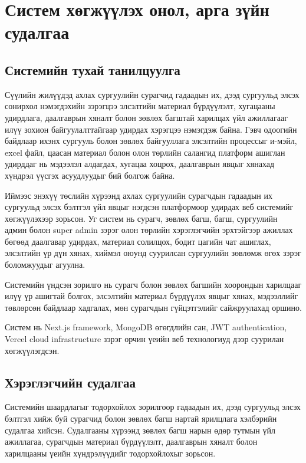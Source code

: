 \chapter{Систем хөгжүүлэх онол, арга зүйн судалгаа}

\section{Системийн тухай танилцуулга}

Сүүлийн жилүүдэд ахлах сургуулийн сурагчид гадаадын их, дээд сургуульд элсэх
сонирхол нэмэгдэхийн зэрэгцээ элсэлтийн материал бүрдүүлэлт, хугацааны удирдлага,
даалгаврын хяналт болон зөвлөх багштай харилцах үйл ажиллагааг илүү зохион
байгуулалттайгаар удирдах хэрэгцээ нэмэгдэж байна. Гэвч одоогийн байдлаар ихэнх
сургууль болон зөвлөх байгууллага элсэлтийн процессыг и-мэйл, excel файл,
цаасан материал болон олон төрлийн салангид платформ ашиглан удирддаг нь
мэдээлэл алдагдах, хугацаа хоцрох, даалгаврын явцыг хянахад хүндрэл үүсгэх
асуудлуудыг бий болгож байна.

Иймээс энэхүү төслийн хүрээнд ахлах сургуулийн сурагчдын гадаадын их
сургуульд элсэх бэлтгэл үйл явцыг нэгдсэн платформоор удирдах веб системийг
хөгжүүлэхээр зорьсон. Уг систем нь сурагч, зөвлөх багш, багш, сургуулийн админ
болон super admin зэрэг олон төрлийн хэрэглэгчийн эрхтэйгээр ажиллах бөгөөд
даалгавар удирдах, материал солилцох, бодит цагийн чат ашиглах, элсэлтийн
үр дүн хянах, хиймэл оюунд суурилсан сургуулийн зөвлөмж өгөх зэрэг боломжуудыг агуулна.

Системийн үндсэн зорилго нь сурагч болон зөвлөх багшийн хоорондын
харилцааг илүү үр ашигтай болгох, элсэлтийн материал бүрдүүлэх явцыг хянах, мэдээллийг төвлөрсөн байдлаар хадгалах, мөн сурагчдын гүйцэтгэлийг
сайжруулахад оршино.

Систем нь Next.js framework, MongoDB өгөгдлийн сан, JWT authentication,
Vercel cloud infrastructure зэрэг орчин үеийн веб технологиуд дээр суурилан
хөгжүүлэгдсэн.

\section{Хэрэглэгчийн судалгаа}

Системийн шаардлагыг тодорхойлох зорилгоор гадаадын их, дээд сургуульд
элсэх бэлтгэл хийж буй сурагчид болон зөвлөх багш нартай ярилцлага
хэлбэрийн судалгаа хийсэн. Судалгааны хүрээнд зөвлөх багш нарын өдөр
тутмын үйл ажиллагаа, сурагчдын материал бүрдүүлэлт, даалгаврын хяналт
болон харилцааны үеийн хүндрэлүүдийг тодорхойлохыг зорьсон.

